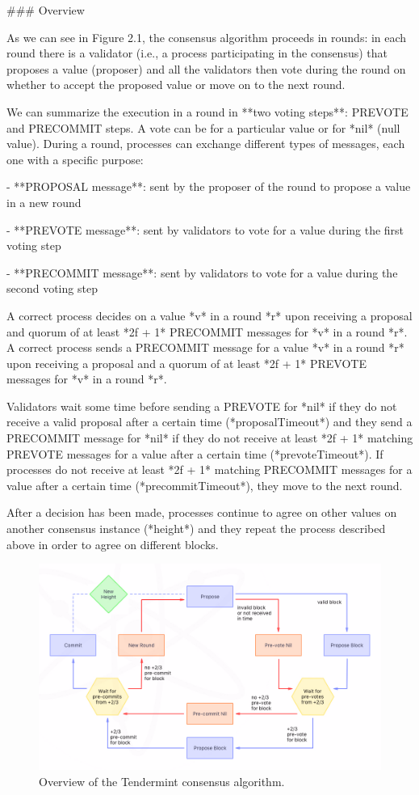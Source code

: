 \documentclass[a4paper,11pt,oneside]{report}
\begin{document}
\begin{markdown}
### Overview

As we can see in Figure 2.1, the consensus algorithm proceeds in rounds: in each round there is a validator (i.e., a process participating in the consensus) that proposes a value (proposer) and all the validators then vote during the round on whether to accept the proposed value or move on to the next round.

We can summarize the execution in a round in **two voting steps**: PREVOTE and PRECOMMIT steps. A vote can be for a particular value or for *nil* (null value). During a round, processes can exchange different types of messages, each one with a specific purpose:
 
- **PROPOSAL message**: sent by the proposer of the round to propose a value in a new round

- **PREVOTE message**: sent by validators to vote for a value during the first voting step

- **PRECOMMIT message**: sent by validators to vote for a value during the second voting step

A correct process decides on a value *v* in a round *r* upon receiving a proposal and quorum of at least *2f + 1* PRECOMMIT messages for *v* in a round *r*. 
A correct process sends a PRECOMMIT message for a value *v* in a round *r* upon receiving a proposal and a quorum of at least *2f + 1* PREVOTE messages for *v* in a round *r*.

Validators wait some time before sending a PREVOTE for *nil* if they do not receive a valid proposal after a certain time (*proposalTimeout*) and they send a PRECOMMIT message for *nil* if they do not receive at least *2f + 1* matching PREVOTE messages for a value after a certain time (*prevoteTimeout*).
If processes do not receive at least *2f + 1* matching PRECOMMIT messages for a value after a certain time (*precommitTimeout*), they move to the next round.

After a decision has been made, processes continue to agree on other values on another consensus instance (*height*) and they repeat the process described above in order to agree on different blocks.

\end{markdown}

\begin{figure}[h]
\centering
\includegraphics[scale=0.45]{tendermint_schema.png} 
\caption{Overview of the Tendermint consensus algorithm.}
\label{fig:subim1}
\end{figure}
\end{document}
